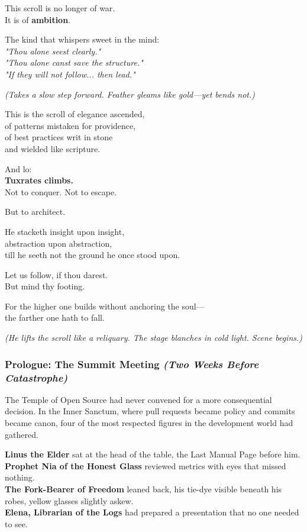 This scroll is no longer of war.\\
It is of \textbf{ambition}.

The kind that whispers sweet in the mind:\\
\emph{"Thou alone seest clearly."}\\
\emph{"Thou alone canst save the structure."}\\
\emph{"If they will not follow... then lead."}

\emph{(Takes a slow step forward. Feather gleams like gold---yet bends not.)}

This is the scroll of elegance ascended,\\
of patterns mistaken for providence,\\
of best practices writ in stone\\
and wielded like scripture.

And lo:\\
\textbf{Tuxrates climbs.}\\
Not to conquer. Not to escape.

But to architect.

He stacketh insight upon insight,\\
abstraction upon abstraction,\\
till he seeth not the ground he once stood upon.

Let us follow, if thou darest.\\
But mind thy footing.

For the higher one builds without anchoring the soul---\\
the farther one hath to fall.

\emph{(He lifts the scroll like a reliquary. The stage blanches in cold light. Scene begins.)}

\bookdivider

\subsubsection{\texorpdfstring{Prologue: The Summit Meeting \emph{(Two Weeks Before Catastrophe)}}{Prologue: The Summit Meeting (Two Weeks Before Catastrophe)}}\label{prologue-the-summit-meeting-two-weeks-before-catastrophe}

The Temple of Open Source had never convened for a more consequential decision. In the Inner Sanctum, where pull requests became policy and commits became canon, four of the most respected figures in the development world had gathered.

\textbf{Linus the Elder} sat at the head of the table, the Last Manual Page before him.\\
\textbf{Prophet Nia of the Honest Glass} reviewed metrics with eyes that missed nothing.\\
\textbf{The Fork-Bearer of Freedom} leaned back, his tie-dye visible beneath his robes, yellow glasses slightly askew.\\
\textbf{Elena, Librarian of the Logs} had prepared a presentation that no one needed to see.

